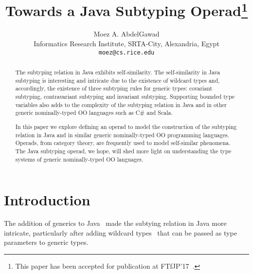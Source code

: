 \documentclass[twocolumn,english]{article}
\numberwithin{equation}{section}
\numberwithin{figure}{section}
\newcommand{\code}[1]{\texttt{#1}}
\begin{document}
\title{Towards a Java Subtyping Operad\footnote{This paper has been accepted for publication at FTfJP'17~\cite{AbdelGawad2017a}.}}

\author{Moez A. AbdelGawad\\Informatics Research Institute, SRTA-City, Alexandria, Egypt\\\code{moez@cs.rice.edu}}

\maketitle

\begin{abstract}
	The subtyping relation in Java exhibits self-similarity. The self-similarity
	in Java subtyping is interesting and intricate due to the existence
	of wildcard types and, accordingly, the existence of three subtyping
	rules for generic types: covariant subtyping, contravariant subtyping
	and invariant subtyping. Supporting bounded type variables also adds
	to the complexity of the subtyping relation in Java and in other generic
	nominally-typed OO languages such as C\# and Scala.
	
	In this paper we explore defining an operad to model the construction
	of the subtyping relation in Java and in similar generic nominally-typed
	OO programming languages. Operads, from category theory, are frequently
	used to model self-similar phenomena. The Java subtyping operad, we
	hope, will shed more light on understanding the type systems of generic
	nominally-typed OO languages.
\end{abstract}

\section{\label{sec:Introduction}Introduction}

\def\JSO{\mathcal{JSO}}
\def\JSM{JSM}
The addition of generics to Java~\cite{JLS05,JLS14} made the subtying
relation in Java more intricate, particularly after adding wildcard
types~\cite{Torgersen2004} that can be passed as type parameters
to generic types.
\end{document}
